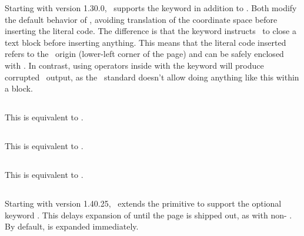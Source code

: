 \documentclass{pdftexmanual}
\begin{document}
Starting with version 1.30.0, \PDFTEX\ supports the keyword 
in addition to . Both modify the default behavior of
, avoiding translation of the coordinate space before
inserting the literal code. The difference is that the 
keyword instructs \PDFTEX\ to close a  text block before
inserting anything. This means that the literal code inserted refers to
the \PDF\ origin (lower-left corner of the page) and can be safely
enclosed with . In contrast, using  operators
inside  with the  keyword will produce
corrupted \PDF\ output, as the \PDF\ standard doesn't allow doing
anything like this within a  block.

\subsection{}

This is equivalent to .

\subsection{}

This is equivalent to .

\subsection{}

This is equivalent to .

\subsection{}

Starting with version 1.40.25, \PDFTEX\ extends the 
primitive to support the optional keyword . This delays
expansion of  until the page is shipped out, as with
non- . By default,  is expanded
immediately.
\end{document}
